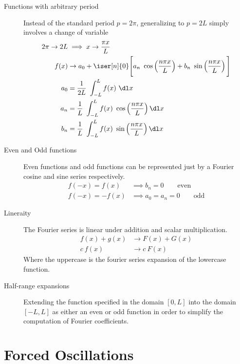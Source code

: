 \begin{description}
    \item[Functions with arbitrary period] Instead of the standard period $ p = 2\pi $,
        generalizing to $ p = 2L $ simply involves a change of variable
        \begin{align}
            2\pi \to 2L & \implies x \to \frac{\pi x}{L}            \\
            f(x)        & \to a_0 + \iser[n]{0} \Bigg[
                a_n\ \cos\left( \frac{n\pi x}{L} \right) +
            b_n\ \sin\left( \frac{n\pi x}{L} \right) \Bigg]         \\
            a_0         & = \frac{1}{2L}\ \int_{-L}^{L} f(x)\ \dl x \\
            a_n         & = \frac{1}{L}\ \int_{-L}^{L}
            f(x)\ \cos\left( \frac{n\pi x}{L} \right) \dl x         \\
            b_n         & = \frac{1}{L}\ \int_{-L}^{L}
            f(x)\ \sin\left( \frac{n\pi x}{L} \right) \dl x
        \end{align}

    \item[Even and Odd functions] Even functions and odd functions can be
        represented just by a Fourier cosine and sine series respectively.
        \begin{align}
            f(-x) = f(x)  & \implies b_n = 0 \qquad \text{even}      \\
            f(-x) = -f(x) & \implies a_0 = a_n = 0 \qquad \text{odd}
        \end{align}

    \item[Lineraity] The Fourier series is linear under addition and scalar
        multiplication.
        \begin{align}
            f(x) + g(x) & \to F(x) + G(x) \\
            c\ f(x)     & \to c\ F(x)
        \end{align}
        Where the uppercase is the fourier series expansion of the lowercase function.

    \item[Half-range expansions] Extending the function specified in the domain
        $ [0, L] $ into the domain $ [-L, L] $ as either an even or odd function in order
        to simplify the computation of Fourier coefficients.
\end{description}

\section{Forced Oscillations}

